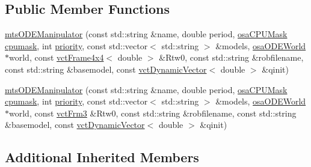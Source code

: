 \subsection*{Public Member Functions}
\begin{DoxyCompactItemize}
\item 
\hyperlink{classmts_o_d_e_manipulator_ab75a6623d972fcadaa16aa22dd120109}{mts\-O\-D\-E\-Manipulator} (const std\-::string \&name, double period, \hyperlink{osa_c_p_u_affinity_8h_aaec7cdd7797e5e6eb5438c15fee5477a}{osa\-C\-P\-U\-Mask} \hyperlink{classmts_o_d_e_manipulator_task_aaff55dbeff38e947707c6b3405041622}{cpumask}, int \hyperlink{classmts_o_d_e_manipulator_task_ae2b16e466e4d216b2cf13ae89414696a}{priority}, const std\-::vector$<$ std\-::string $>$ \&models, \hyperlink{classosa_o_d_e_world}{osa\-O\-D\-E\-World} $\ast$world, const \hyperlink{classvct_frame4x4}{vct\-Frame4x4}$<$ double $>$ \&Rtw0, const std\-::string \&robfilename, const std\-::string \&basemodel, const \hyperlink{classvct_dynamic_vector}{vct\-Dynamic\-Vector}$<$ double $>$ \&qinit)
\item 
\hyperlink{classmts_o_d_e_manipulator_aa68514912f2b9e9d50b8b6d756fba4f8}{mts\-O\-D\-E\-Manipulator} (const std\-::string \&name, double period, \hyperlink{osa_c_p_u_affinity_8h_aaec7cdd7797e5e6eb5438c15fee5477a}{osa\-C\-P\-U\-Mask} \hyperlink{classmts_o_d_e_manipulator_task_aaff55dbeff38e947707c6b3405041622}{cpumask}, int \hyperlink{classmts_o_d_e_manipulator_task_ae2b16e466e4d216b2cf13ae89414696a}{priority}, const std\-::vector$<$ std\-::string $>$ \&models, \hyperlink{classosa_o_d_e_world}{osa\-O\-D\-E\-World} $\ast$world, const \hyperlink{vct_transformation_types_8h_a81feda0a02c2d1bc26e5553f409fed20}{vct\-Frm3} \&Rtw0, const std\-::string \&robfilename, const std\-::string \&basemodel, const \hyperlink{classvct_dynamic_vector}{vct\-Dynamic\-Vector}$<$ double $>$ \&qinit)
\end{DoxyCompactItemize}
\subsection*{Additional Inherited Members}


